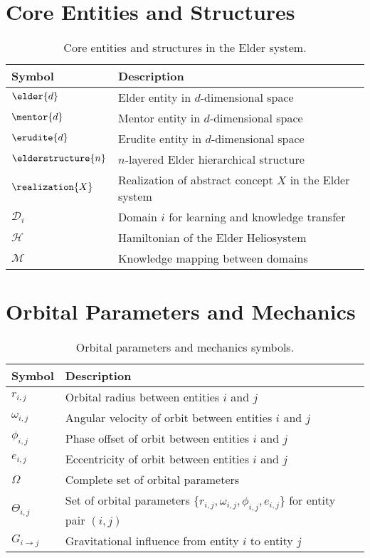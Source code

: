 \section{Core Entities and Structures}

\begin{table}[h]
\centering
\begin{tabular}{|l|p{10cm}|}
\hline
\textbf{Symbol} & \textbf{Description} \\
\hline
$\elder{d}$ & Elder entity in $d$-dimensional space \\
\hline
$\mentor{d}$ & Mentor entity in $d$-dimensional space \\
\hline
$\erudite{d}$ & Erudite entity in $d$-dimensional space \\
\hline
$\elderstructure{n}$ & $n$-layered Elder hierarchical structure \\
\hline
$\realization{X}$ & Realization of abstract concept $X$ in the Elder system \\
\hline
$\mathcal{D}_i$ & Domain $i$ for learning and knowledge transfer \\
\hline
$\mathcal{H}$ & Hamiltonian of the Elder Heliosystem \\
\hline
$\mathcal{M}$ & Knowledge mapping between domains \\
\hline
\end{tabular}
\caption{Core entities and structures in the Elder system.}
\label{tab:symbols_core}
\end{table}

\section{Orbital Parameters and Mechanics}

\begin{table}[h]
\centering
\begin{tabular}{|l|p{10cm}|}
\hline
\textbf{Symbol} & \textbf{Description} \\
\hline
$r_{i,j}$ & Orbital radius between entities $i$ and $j$ \\
\hline
$\omega_{i,j}$ & Angular velocity of orbit between entities $i$ and $j$ \\
\hline
$\phi_{i,j}$ & Phase offset of orbit between entities $i$ and $j$ \\
\hline
$e_{i,j}$ & Eccentricity of orbit between entities $i$ and $j$ \\
\hline
$\Omega$ & Complete set of orbital parameters \\
\hline
$\Theta_{i,j}$ & Set of orbital parameters $\{r_{i,j}, \omega_{i,j}, \phi_{i,j}, e_{i,j}\}$ for entity pair $(i,j)$ \\
\hline
$G_{i \rightarrow j}$ & Gravitational influence from entity $i$ to entity $j$ \\
\hline
\end{tabular}
\caption{Orbital parameters and mechanics symbols.}
\label{tab:symbols_orbital}
\end{table}

